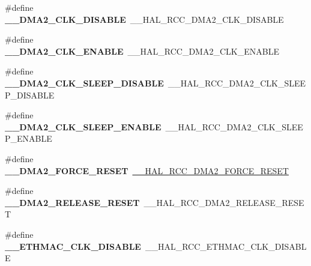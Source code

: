 \begin{DoxyCompactItemize}
\#define {\bfseries \+\_\+\+\_\+\+D\+M\+A2\+\_\+\+C\+L\+K\+\_\+\+D\+I\+S\+A\+B\+LE}~\+\_\+\+\_\+\+H\+A\+L\+\_\+\+R\+C\+C\+\_\+\+D\+M\+A2\+\_\+\+C\+L\+K\+\_\+\+D\+I\+S\+A\+B\+LE
\item 
\mbox{\label{group___h_a_l___r_c_c___aliased_gac2d5e13fd9b6bf9608a8fdba50558dce}} 
\#define {\bfseries \+\_\+\+\_\+\+D\+M\+A2\+\_\+\+C\+L\+K\+\_\+\+E\+N\+A\+B\+LE}~\+\_\+\+\_\+\+H\+A\+L\+\_\+\+R\+C\+C\+\_\+\+D\+M\+A2\+\_\+\+C\+L\+K\+\_\+\+E\+N\+A\+B\+LE
\item 
\mbox{\label{group___h_a_l___r_c_c___aliased_ga6ac46665d831d56d75994809778459ce}} 
\#define {\bfseries \+\_\+\+\_\+\+D\+M\+A2\+\_\+\+C\+L\+K\+\_\+\+S\+L\+E\+E\+P\+\_\+\+D\+I\+S\+A\+B\+LE}~\+\_\+\+\_\+\+H\+A\+L\+\_\+\+R\+C\+C\+\_\+\+D\+M\+A2\+\_\+\+C\+L\+K\+\_\+\+S\+L\+E\+E\+P\+\_\+\+D\+I\+S\+A\+B\+LE
\item 
\mbox{\label{group___h_a_l___r_c_c___aliased_gaf81a26ac7c46c241b8c8c38194bca9e2}} 
\#define {\bfseries \+\_\+\+\_\+\+D\+M\+A2\+\_\+\+C\+L\+K\+\_\+\+S\+L\+E\+E\+P\+\_\+\+E\+N\+A\+B\+LE}~\+\_\+\+\_\+\+H\+A\+L\+\_\+\+R\+C\+C\+\_\+\+D\+M\+A2\+\_\+\+C\+L\+K\+\_\+\+S\+L\+E\+E\+P\+\_\+\+E\+N\+A\+B\+LE
\item 
\mbox{\label{group___h_a_l___r_c_c___aliased_gac4c41afd72bb5ab0fe1da7f4444ff213}} 
\#define {\bfseries \+\_\+\+\_\+\+D\+M\+A2\+\_\+\+F\+O\+R\+C\+E\+\_\+\+R\+E\+S\+ET}~\mbox{\hyperlink{group___r_c_c_ex___force___release___peripheral___reset_gaf0be736e6cdebf31eeded223acc25613}{\+\_\+\+\_\+\+H\+A\+L\+\_\+\+R\+C\+C\+\_\+\+D\+M\+A2\+\_\+\+F\+O\+R\+C\+E\+\_\+\+R\+E\+S\+ET}}
\item 
\mbox{\label{group___h_a_l___r_c_c___aliased_gaea54267740103243fa99cba644aaffcc}} 
\#define {\bfseries \+\_\+\+\_\+\+D\+M\+A2\+\_\+\+R\+E\+L\+E\+A\+S\+E\+\_\+\+R\+E\+S\+ET}~\+\_\+\+\_\+\+H\+A\+L\+\_\+\+R\+C\+C\+\_\+\+D\+M\+A2\+\_\+\+R\+E\+L\+E\+A\+S\+E\+\_\+\+R\+E\+S\+ET
\item 
\mbox{\label{group___h_a_l___r_c_c___aliased_ga66ef6d7fc598a25a812e475c9382a730}} 
\#define {\bfseries \+\_\+\+\_\+\+E\+T\+H\+M\+A\+C\+\_\+\+C\+L\+K\+\_\+\+D\+I\+S\+A\+B\+LE}~\+\_\+\+\_\+\+H\+A\+L\+\_\+\+R\+C\+C\+\_\+\+E\+T\+H\+M\+A\+C\+\_\+\+C\+L\+K\+\_\+\+D\+I\+S\+A\+B\+LE

\end{DoxyCompactItemize}
